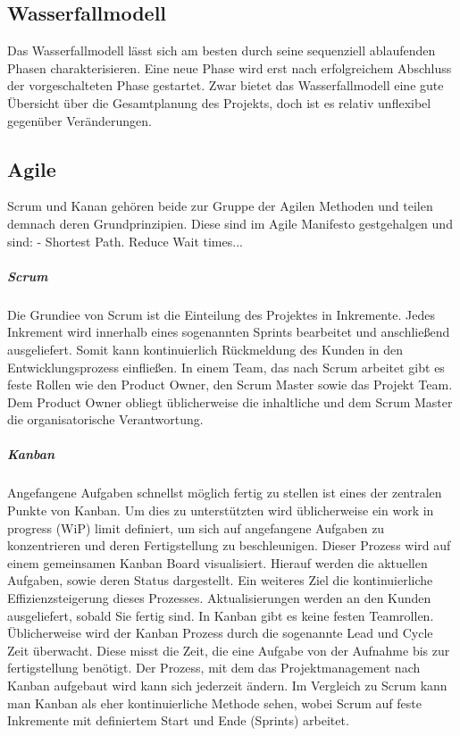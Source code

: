 \documentclass[twocolumn,10pt]{asme2ej}
\begin{document}
\subsection{Wasserfallmodell}
Das Wasserfallmodell lässt sich am besten durch seine sequenziell ablaufenden Phasen charakterisieren. Eine neue Phase wird erst nach erfolgreichem Abschluss der vorgeschalteten Phase gestartet. Zwar bietet das Wasserfallmodell eine gute Übersicht über die Gesamtplanung des Projekts, doch ist es relativ unflexibel gegenüber Veränderungen. \cite{Wasserfall}

\subsection{Agile}
Scrum und Kanan gehören beide zur Gruppe der Agilen Methoden und teilen demnach deren Grundprinzipien. Diese sind im Agile Manifesto gestgehalgen und sind:
- Shortest Path. Reduce Wait times...
\cite{beck2001agile}


\subparagraph{Scrum}
Die Grundiee von Scrum ist die Einteilung des Projektes in Inkremente. Jedes Inkrement wird innerhalb eines sogenannten Sprints bearbeitet und anschließend ausgeliefert. Somit kann kontinuierlich Rückmeldung des Kunden in den Entwicklungsprozess einfließen. In einem Team, das nach Scrum arbeitet gibt es feste Rollen wie den Product Owner, den Scrum Master sowie das Projekt Team. Dem Product Owner obliegt üblicherweise die inhaltliche und dem Scrum Master die organisatorische Verantwortung.

\subparagraph{Kanban}
Angefangene Aufgaben schnellst möglich fertig zu stellen ist eines der zentralen Punkte von Kanban. Um dies zu unterstützten wird üblicherweise ein work in progress (WiP) limit definiert, um sich auf angefangene Aufgaben zu konzentrieren und deren Fertigstellung zu beschleunigen. Dieser Prozess wird auf einem gemeinsamen Kanban Board visualisiert. Hierauf werden die aktuellen Aufgaben, sowie deren Status dargestellt. Ein weiteres Ziel die kontinuierliche Effizienzsteigerung dieses Prozesses.\cite{kanban} Aktualisierungen werden an den Kunden ausgeliefert, sobald Sie fertig sind. In Kanban gibt es keine festen Teamrollen. Üblicherweise wird der Kanban Prozess durch die sogenannte Lead und Cycle Zeit überwacht. Diese misst die Zeit, die eine Aufgabe von der Aufnahme bis zur fertigstellung benötigt. Der Prozess, mit dem das Projektmanagement nach Kanban aufgebaut wird kann sich jederzeit ändern. Im Vergleich zu Scrum kann man Kanban als eher kontinuierliche Methode sehen, wobei Scrum auf feste Inkremente mit definiertem Start und Ende (Sprints) arbeitet.
\end{document}
